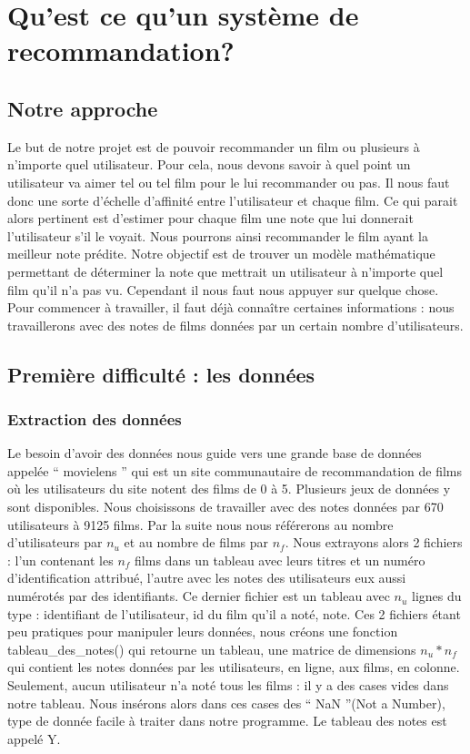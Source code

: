 \documentclass[a4paper,10pt]{article}
\begin{document}
\section{Qu'est ce qu'un système de recommandation?}

\subsection{Notre approche}

Le but de notre projet est de pouvoir recommander un film ou plusieurs à n'importe quel utilisateur. 
Pour cela, nous devons savoir à quel point un utilisateur va aimer tel ou tel film pour le lui recommander ou pas. 
Il nous faut donc une sorte d'échelle d'affinité entre l'utilisateur et chaque film. Ce qui parait alors pertinent est d'estimer pour chaque film une note que lui donnerait l'utilisateur s'il le voyait. 
Nous pourrons ainsi recommander le film ayant la meilleur note prédite.
Notre objectif est de trouver un modèle mathématique permettant de déterminer la note que mettrait un utilisateur à n'importe quel film qu'il n'a pas vu. Cependant il nous faut nous appuyer sur quelque chose. Pour commencer à travailler, il faut déjà connaître certaines informations : nous travaillerons avec des notes de films données par un certain nombre d'utilisateurs.

\subsection{Première difficulté : les données}
\subsubsection{Extraction des données}

Le besoin d'avoir des données nous guide vers une grande base de données appelée `` movielens '' qui est un site communautaire de recommandation de films où les utilisateurs du site notent des films de 0 à 5.
Plusieurs jeux de données y sont disponibles. 
Nous choisissons de travailler avec des notes données par 670 utilisateurs à 9125 films.
Par la suite nous nous référerons au nombre d'utilisateurs par $n_u$ et au nombre de films par $n_f$.
Nous extrayons alors 2 fichiers : l’un contenant les $n_f$ films dans un tableau avec leurs titres et un numéro d'identification attribué, 
l’autre avec les notes des utilisateurs eux aussi numérotés par des identifiants.
Ce dernier fichier est un tableau avec $n_u$ lignes du type : identifiant de l’utilisateur, id du film qu’il a noté, note. 
Ces 2 fichiers étant peu pratiques pour manipuler leurs données,  
nous créons une fonction tableau\_des\_notes() qui retourne un tableau, une matrice de dimensions $n_u * n_f$ qui contient les notes données par les utilisateurs, en ligne, aux films, en colonne. Seulement, aucun utilisateur n'a noté tous les films : il y a des cases vides dans notre tableau. Nous insérons alors dans ces cases des `` NaN ''(Not a Number), type de donnée facile à traiter dans notre programme.
Le tableau des notes est appelé Y.
\end{document}
